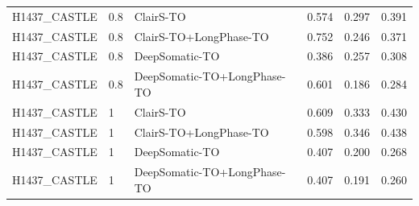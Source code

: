 \documentclass[pdflatex,sn-nature]{sn-jnl}
\begin{document}
{\begin{longtable}{@{}lllccc@{}}
  H1437\_CASTLE & 0.8 & ClairS-TO & 0.574 & 0.297 & 0.391 \\
  H1437\_CASTLE & 0.8 & ClairS-TO+LongPhase-TO & 0.752 & 0.246 & 0.371 \\
  H1437\_CASTLE & 0.8 & DeepSomatic-TO & 0.386 & 0.257 & 0.308 \\
  H1437\_CASTLE & 0.8 & DeepSomatic-TO+LongPhase-TO & 0.601 & 0.186 & 0.284 \\
  H1437\_CASTLE & 1 & ClairS-TO & 0.609 & 0.333 & 0.430 \\
  H1437\_CASTLE & 1 & ClairS-TO+LongPhase-TO & 0.598 & 0.346 & 0.438 \\
  H1437\_CASTLE & 1 & DeepSomatic-TO & 0.407 & 0.200 & 0.268 \\
  H1437\_CASTLE & 1 & DeepSomatic-TO+LongPhase-TO & 0.407 & 0.191 & 0.260 \\
\end{longtable}
}
\end{document}
